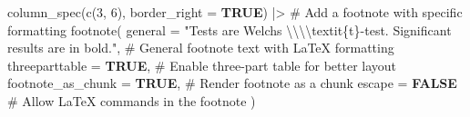 \documentclass[
  bookmarksnumbered]{article}
\newenvironment{Shaded}{\begin{snugshade}}{\end{snugshade}}
\newcommand{\AttributeTok}[1]{\textcolor[rgb]{0.80,0.80,0.80}{#1}}
\newcommand{\CommentTok}[1]{\textcolor[rgb]{0.50,0.62,0.50}{#1}}
\newcommand{\ConstantTok}[1]{\textcolor[rgb]{0.86,0.64,0.64}{\textbf{#1}}}
\newcommand{\DecValTok}[1]{\textcolor[rgb]{0.86,0.86,0.80}{#1}}
\newcommand{\FunctionTok}[1]{\textcolor[rgb]{0.94,0.94,0.56}{#1}}
\newcommand{\NormalTok}[1]{\textcolor[rgb]{0.80,0.80,0.80}{#1}}
\newcommand{\SpecialCharTok}[1]{\textcolor[rgb]{0.86,0.64,0.64}{#1}}
\newcommand{\StringTok}[1]{\textcolor[rgb]{0.80,0.58,0.58}{#1}}
\begin{document}
\begin{Shaded}
\begin{Highlighting}[]
  \FunctionTok{column\_spec}\NormalTok{(}\FunctionTok{c}\NormalTok{(}\DecValTok{3}\NormalTok{, }\DecValTok{6}\NormalTok{), }\AttributeTok{border\_right =} \ConstantTok{TRUE}\NormalTok{) }\SpecialCharTok{|\textgreater{}}
  \CommentTok{\# Add a footnote with specific formatting}
  \FunctionTok{footnote}\NormalTok{(}
    \AttributeTok{general =} \StringTok{"Tests are Welch\textquotesingle{}s }\SpecialCharTok{\textbackslash{}\textbackslash{}\textbackslash{}\textbackslash{}}\StringTok{textit\{t\}{-}test. Significant results are in bold."}\NormalTok{,}
    \CommentTok{\# General footnote text with LaTeX formatting}
    \AttributeTok{threeparttable =} \ConstantTok{TRUE}\NormalTok{, }\CommentTok{\# Enable three{-}part table for better layout}
    \AttributeTok{footnote\_as\_chunk =} \ConstantTok{TRUE}\NormalTok{, }\CommentTok{\# Render footnote as a chunk}
    \AttributeTok{escape =} \ConstantTok{FALSE} \CommentTok{\# Allow LaTeX commands in the footnote}
\NormalTok{  )}
\end{Highlighting}
\end{Shaded}
\end{document}
